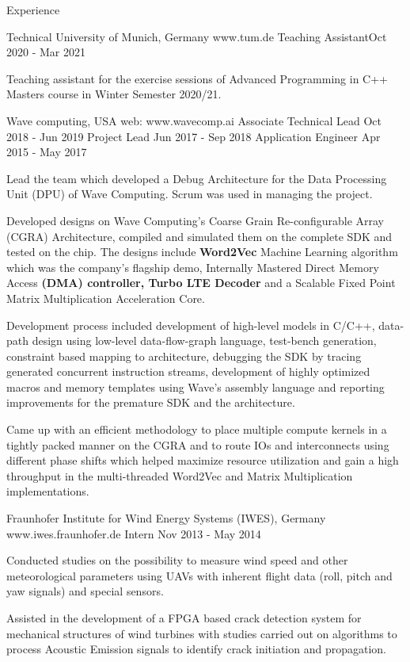 \documentclass[
	11pt, %
]{./../assets/resume} %
\begin{document}
\begin{rSection}{Experience}
\newpage

	\begin{rExperienceOnePos} {Technical University of Munich, Germany} {www.tum.de}
    {Teaching Assistant}{Oct 2020 - Mar 2021}
		\item
        Teaching assistant for the exercise sessions of Advanced Programming in C++ Masters course in Winter Semester 2020/21.
	\end{rExperienceOnePos}

	\begin{rExperienceThreePos}{Wave computing, USA} {web: www.wavecomp.ai}
    {Associate Technical Lead} {Oct 2018 - Jun 2019}
    {Project Lead} {Jun 2017 - Sep 2018}
    {Application Engineer} {Apr 2015 - May 2017}
        \item
        Lead the team which developed a Debug Architecture for the Data Processing Unit (DPU) of Wave Computing. Scrum was used in managing the project.
        \item
        Developed designs on Wave Computing’s Coarse Grain Re-configurable Array (CGRA) Architecture, compiled and simulated them on the complete SDK and tested on the chip. The designs include \textbf{Word2Vec} Machine Learning algorithm which was the company's flagship demo, Internally Mastered Direct Memory Access \textbf{(DMA) controller, Turbo LTE Decoder} and a Scalable Fixed Point Matrix Multiplication Acceleration Core.
        \item
        Development process included development of high-level models in C/C++, data-path design using low-level data-flow-graph language, test-bench generation, constraint based mapping to architecture, debugging the SDK by tracing generated concurrent instruction streams, development of highly optimized macros and memory templates using Wave’s assembly language and reporting improvements for the premature SDK and the architecture.
        \item
        Came up with an efficient methodology to place multiple compute kernels in a tightly packed manner on the CGRA and to route IOs and interconnects using different phase shifts which helped maximize resource utilization and gain a high throughput in the multi-threaded Word2Vec and Matrix Multiplication implementations.
	\end{rExperienceThreePos}

	\begin{rExperienceOnePos} {Fraunhofer Institute for Wind Energy Systems (IWES), Germany} {www.iwes.fraunhofer.de}
    {Intern} {Nov 2013 - May 2014}
        \item
        Conducted studies on the possibility to measure wind speed and other meteorological parameters using UAVs with inherent flight data (roll, pitch and yaw signals) and special sensors.
        \item
        Assisted in the development of a FPGA based crack detection system for mechanical structures of wind turbines with studies carried out on algorithms to process Acoustic Emission signals to identify crack initiation and propagation.
	\end{rExperienceOnePos}
\end{rSection}
\end{document}
